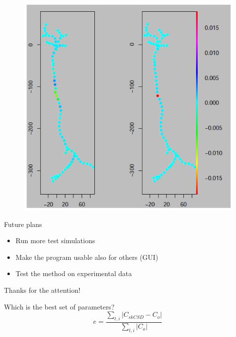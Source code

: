 \documentclass[11pt,a4paper,titlepage]{beamer}
\begin{document}

\begin{frame}
\begin{figure}
\includegraphics[height=8 cm]{plots/colourpoints.png}
\end{figure}

\end{frame}



\begin{frame}{Future plans}
\begin{itemize}
\item Run more test simulations
\item Make the program usable also for others (GUI)
\item Test the method on experimental data 
\end{itemize}

\end{frame}



\begin{frame}
\begin{center}

{\Large Thanks for the attention!}
\end{center}
\end{frame}



\begin{frame}{Which is the best set of parameters?}
\begin{equation}
e= \frac{\sum\limits_{t,i} |C_{skCSD}-C_o|}{\sum\limits_{t,i}|C_o|}
\end{equation}
\end{frame}
\end{document}
